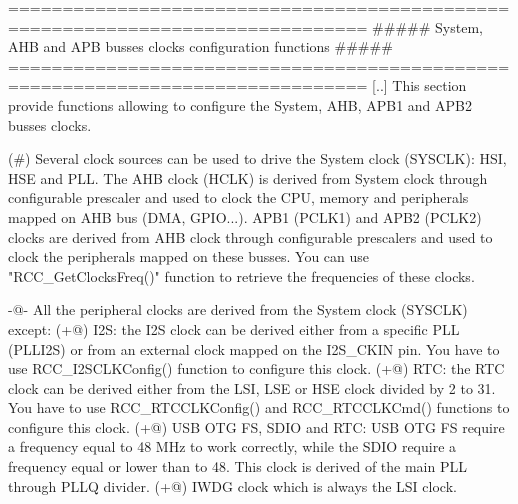 \begin{DoxyVerb} ===============================================================================
      ##### System, AHB and APB busses clocks configuration functions #####
 ===============================================================================  
    [..]
      This section provide functions allowing to configure the System, AHB, APB1 and 
      APB2 busses clocks.
  
      (#) Several clock sources can be used to drive the System clock (SYSCLK): HSI,
          HSE and PLL.
          The AHB clock (HCLK) is derived from System clock through configurable 
          prescaler and used to clock the CPU, memory and peripherals mapped 
          on AHB bus (DMA, GPIO...). APB1 (PCLK1) and APB2 (PCLK2) clocks are derived 
          from AHB clock through configurable prescalers and used to clock 
          the peripherals mapped on these busses. You can use 
          "RCC_GetClocksFreq()" function to retrieve the frequencies of these clocks.  

      -@- All the peripheral clocks are derived from the System clock (SYSCLK) except:
        (+@) I2S: the I2S clock can be derived either from a specific PLL (PLLI2S) or
             from an external clock mapped on the I2S_CKIN pin. 
             You have to use RCC_I2SCLKConfig() function to configure this clock. 
        (+@) RTC: the RTC clock can be derived either from the LSI, LSE or HSE clock
             divided by 2 to 31. You have to use RCC_RTCCLKConfig() and RCC_RTCCLKCmd()
             functions to configure this clock. 
        (+@) USB OTG FS, SDIO and RTC: USB OTG FS require a frequency equal to 48 MHz
             to work correctly, while the SDIO require a frequency equal or lower than
             to 48. This clock is derived of the main PLL through PLLQ divider.
        (+@) IWDG clock which is always the LSI clock.
       

\end{DoxyVerb}
